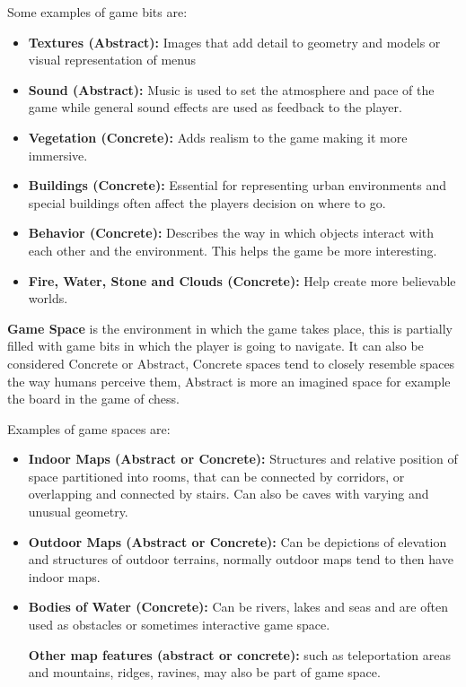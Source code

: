 \documentclass[runningheads]{llncs}
\begin{document}
Some examples of game bits are:
\begin{itemize}
    \item\textbf{Textures (Abstract):} Images that add detail to geometry and models or visual representation of menus
    
    \item\textbf{Sound (Abstract):} Music is used to set the atmosphere and pace of the game while general sound effects are used as feedback to the player. 
    
    \item\textbf{Vegetation (Concrete):} Adds realism to the game making it more immersive.
    
    \item\textbf{Buildings (Concrete):} Essential for representing urban environments and special buildings often affect the players decision on where to go.
    
    \item\textbf{Behavior (Concrete):} Describes the way in which objects interact with each other and the environment. This helps the game be more interesting.
    \item\textbf{Fire, Water, Stone and Clouds (Concrete):} Help create more believable worlds.
\end{itemize}

\textbf{Game Space} is the environment in which the game takes place, this is partially filled with game bits in which the player is going to navigate. It can also be considered Concrete or Abstract, Concrete spaces tend to closely resemble spaces the way humans perceive them, Abstract is more an imagined space for example the board in the game of chess.

Examples of game spaces are:
\begin{itemize}
    \item\textbf{Indoor Maps (Abstract or Concrete):} Structures and relative position of space partitioned into rooms, that can be connected by corridors, or overlapping and connected by stairs. Can also be caves with varying and unusual geometry.
    
    \item\textbf{Outdoor Maps (Abstract or Concrete):} Can be depictions of elevation and structures of outdoor terrains, normally outdoor maps tend to then have indoor maps.
    
    \item\textbf{Bodies of Water (Concrete):} Can be rivers, lakes and seas and are often used as obstacles or sometimes interactive game space.
    
    \textbf{Other map features (abstract or concrete):} such as teleportation areas and mountains, ridges, ravines, may also be part of game space.
\end{itemize}
\end{document}

